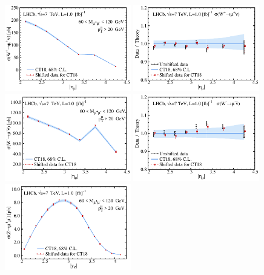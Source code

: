 \begin{figure}[tb]
	\includegraphics[width=0.49\textwidth]{./fig/data_245_CT18__2_abs_ect.pdf}
	\includegraphics[width=0.49\textwidth]{./fig/data_245_CT18__2_DoT_ect.pdf}
	\includegraphics[width=0.49\textwidth]{./fig/data_245_CT18__3_abs_ect.pdf}
	\includegraphics[width=0.49\textwidth]{./fig/data_245_CT18__3_DoT_ect.pdf}
	\includegraphics[width=0.49\textwidth]{./fig/data_245_CT18__1_abs_ect.pdf}

\end{figure}
